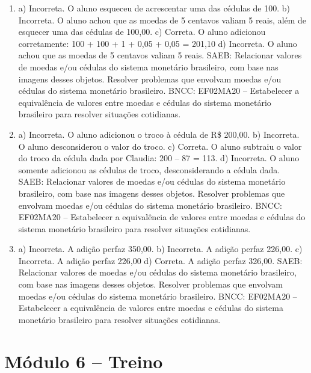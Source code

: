 \begin{enumerate}
\item
a) Incorreta. O aluno esqueceu de acrescentar uma das cédulas de 100.
b) Incorreta. O aluno achou que as moedas de 5 centavos valiam 5 reais, além de esquecer uma das cédulas de 100,00.
c) Correta. O aluno adicionou corretamente: 100 + 100 + 1 + 0,05 + 0,05 = 201,10
d) Incorreta. O aluno achou que as moedas de 5 centavos valiam 5 reais.
SAEB: Relacionar valores de moedas e/ou cédulas do sistema
monetário brasileiro, com base nas imagens desses objetos.
Resolver problemas que envolvam moedas e/ou cédulas do sistema monetário brasileiro.
BNCC: EF02MA20 -- Estabelecer a equivalência de valores entre moedas e
cédulas do sistema monetário brasileiro para resolver situações cotidianas.

\item
a) Incorreta. O aluno adicionou o troco à cédula de R\$ 200,00.
b) Incorreta. O aluno desconsiderou o valor do troco.
c) Correta. O aluno subtraiu o valor do troco da cédula dada por Claudia: 200 -- 87 = 113.
d) Incorreta. O aluno somente adicionou as cédulas de troco, desconsiderando a cédula dada.
SAEB: Relacionar valores de moedas e/ou cédulas do sistema
monetário brasileiro, com base nas imagens desses objetos.
Resolver problemas que envolvam moedas e/ou cédulas do sistema
monetário brasileiro.
BNCC: EF02MA20 -- Estabelecer a equivalência de valores entre moedas e cédulas do sistema monetário brasileiro para resolver situações cotidianas.

\item
a) Incorreta. A adição perfaz 350,00.
b) Incorreta. A adição perfaz 226,00.
c) Incorreta. A adição perfaz 226,00
d) Correta. A adição perfaz 326,00.
SAEB: Relacionar valores de moedas e/ou cédulas do sistema
monetário brasileiro, com base nas imagens desses objetos.
Resolver problemas que envolvam moedas e/ou cédulas do sistema
monetário brasileiro.
BNCC: EF02MA20 -- Estabelecer a equivalência de valores entre moedas e cédulas do sistema monetário brasileiro para resolver situações cotidianas.
\end{enumerate}

\section*{Módulo 6 – Treino}

